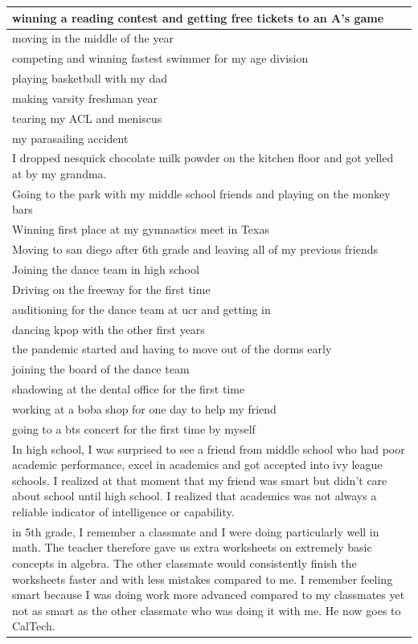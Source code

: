 \documentclass[
  .7em,
  letterpaper,
  DIV=11,
  numbers=noendperiod]{scrartcl}
\begin{document}
\begin{table}
\begin{tabular}{l}
\hline
winning a reading contest and getting free tickets to an A's game\\
\hline
moving in the middle of the year\\
\hline
competing and winning fastest swimmer for my age division\\
\hline
playing basketball with my dad\\
\hline
making varsity freshman year\\
\hline
tearing my ACL and meniscus\\
\hline
my parasailing accident\\
\hline
I dropped nesquick chocolate milk powder on the kitchen floor and got yelled at by my grandma.\\
\hline
Going to the park with my middle school friends and playing on the monkey bars\\
\hline
Winning first place at my gymnastics meet in Texas\\
\hline
Moving to san diego after 6th grade and leaving all of my previous friends\\
\hline
Joining the dance team in high school\\
\hline
Driving on the freeway for the first time\\
\hline
auditioning for the dance team at ucr and getting in\\
\hline
dancing kpop with the other first years\\
\hline
the pandemic started and having to move out of the dorms early\\
\hline
joining the board of the dance team\\
\hline
shadowing at the dental office for the first time\\
\hline
working at a boba shop for one day to help my friend\\
\hline
going to a bts concert for the first time by myself\\
\hline
In high school, I was surprised to see a friend from middle school who had poor academic performance, excel in academics and got accepted into ivy league schools. I realized at that moment that my friend was smart but didn't care about school until high school. I realized that academics was not always a reliable indicator of intelligence or capability.\\
\hline
in 5th grade, I remember a classmate and I were doing particularly well in math. The teacher therefore gave us extra worksheets on extremely basic concepts in algebra. The other classmate would consistently finish the worksheets faster and with less mistakes compared to me. I remember feeling smart because I was doing work more advanced compared to my classmates yet not as smart as the other classmate who was doing it with me. He now goes to CalTech.\\

\end{tabular}
\end{table}
\end{document}
